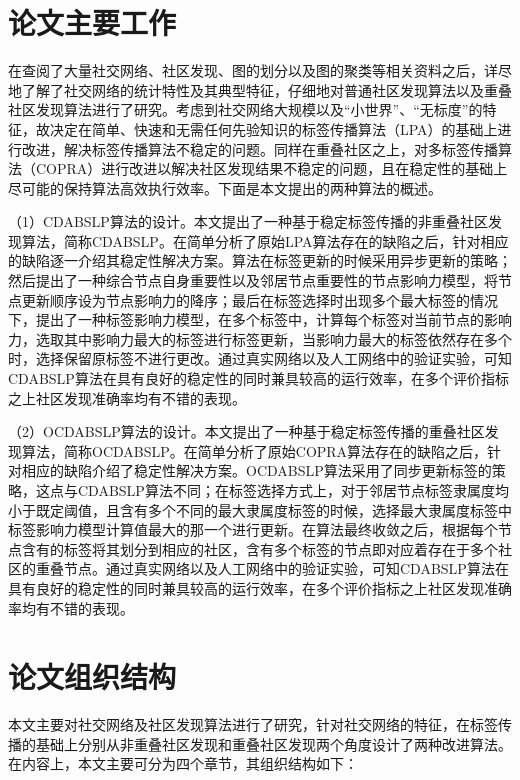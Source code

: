 \section{论文主要工作}

在查阅了大量社交网络、社区发现、图的划分以及图的聚类等相关资料之后，详尽地了解了社交网络的统计特性及其典型特征，仔细地对普通社区发现算法以及重叠社区发现算法进行了研究。考虑到社交网络大规模以及“小世界”、“无标度”的特征，故决定在简单、快速和无需任何先验知识的标签传播算法（LPA）的基础上进行改进，解决标签传播算法不稳定的问题。同样在重叠社区之上，对多标签传播算法（COPRA）进行改进以解决社区发现结果不稳定的问题，且在稳定性的基础上尽可能的保持算法高效执行效率。下面是本文提出的两种算法的概述。

（1）CDABSLP算法的设计。本文提出了一种基于稳定标签传播的非重叠社区发现算法，简称CDABSLP。在简单分析了原始LPA算法存在的缺陷之后，针对相应的缺陷逐一介绍其稳定性解决方案。算法在标签更新的时候采用异步更新的策略；然后提出了一种综合节点自身重要性以及邻居节点重要性的节点影响力模型，将节点更新顺序设为节点影响力的降序；最后在标签选择时出现多个最大标签的情况下，提出了一种标签影响力模型，在多个标签中，计算每个标签对当前节点的影响力，选取其中影响力最大的标签进行标签更新，当影响力最大的标签依然存在多个时，选择保留原标签不进行更改。通过真实网络以及人工网络中的验证实验，可知CDABSLP算法在具有良好的稳定性的同时兼具较高的运行效率，在多个评价指标之上社区发现准确率均有不错的表现。

（2）OCDABSLP算法的设计。本文提出了一种基于稳定标签传播的重叠社区发现算法，简称OCDABSLP。在简单分析了原始COPRA算法存在的缺陷之后，针对相应的缺陷介绍了稳定性解决方案。OCDABSLP算法采用了同步更新标签的策略，这点与CDABSLP算法不同；在标签选择方式上，对于邻居节点标签隶属度均小于既定阈值，且含有多个不同的最大隶属度标签的时候，选择最大隶属度标签中标签影响力模型计算值最大的那一个进行更新。在算法最终收敛之后，根据每个节点含有的标签将其划分到相应的社区，含有多个标签的节点即对应着存在于多个社区的重叠节点。通过真实网络以及人工网络中的验证实验，可知CDABSLP算法在具有良好的稳定性的同时兼具较高的运行效率，在多个评价指标之上社区发现准确率均有不错的表现。


\section{论文组织结构}

本文主要对社交网络及社区发现算法进行了研究，针对社交网络的特征，在标签传播的基础上分别从非重叠社区发现和重叠社区发现两个角度设计了两种改进算法。在内容上，本文主要可分为四个章节，其组织结构如下：

